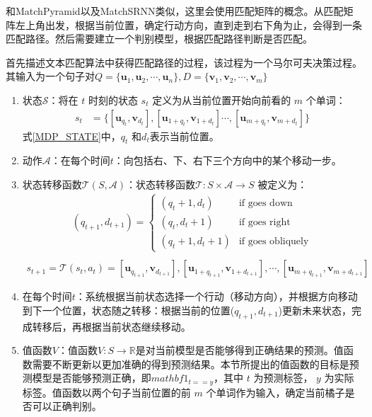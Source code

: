 和MatchPyramid以及MatchSRNN类似，这里会使用匹配矩阵的概念。从匹配矩阵左上角出发，根据当前位置，确定行动方向，直到走到右下角为止，会得到一条匹配路径。然后需要建立一个判别模型，根据匹配路径判断是否匹配。

首先描述文本匹配算法中获得匹配路径的过程，该过程为一个马尔可夫决策过程。其输入为一个句子对$Q=\{\mathbf{u}_1, \mathbf{u}_2,\cdots,\mathbf{u}_n\}, D=\{\mathbf{v}_1, \mathbf{v}_2,\cdots,\mathbf{v}_m\}$

\begin{enumerate}
	\item 状态$\mathcal{S}$：将在 $t$ 时刻的状态 $s_t$ 定义为从当前位置开始向前看的 $m$ 个单词：
	\begin{equation}\label{MDP_STATE}
	\begin{aligned}
		s_t &= \{[\mathbf{u}_{q_t}, \mathbf{v}_{d_t}], [\mathbf{u}_{1+q_t},\mathbf{v}_{1+d_t}] \cdots, [\mathbf{u}_{m+q_t}, \mathbf{v}_{m+d_t}]\}
	\end{aligned}
	\end{equation}
	式\eqref{MDP_STATE}中，$q_t$ 和$d_t$表示当前位置。
	\item 动作$\mathcal{A}$：在每个时间$t$：向包括右、下、右下三个方向中的某个移动一步。
	\item 状态转移函数$\mathcal{T}(S,\mathcal{A})$：状态转移函数$\mathcal{T}:S\times \mathcal{A}\rightarrow S$ 被定义为：
	\begin{equation}\label{MDP_STATE}
	\begin{aligned}
		(q_{t+1}, d_{t+1}) =
\begin{cases}
(q_{t} + 1, d_{t}) &\text{if goes down} \\
(q_{t}, d_{t} + 1) &\text{if goes right}  \\
(q_{t} + 1, d_{t} + 1) &\text{if goes obliquely}
\end{cases} \\
	\end{aligned}
	\end{equation}
	\begin{equation}\label{MDP_STATE2}
	\begin{aligned}
		s_{t+1} = \mathcal{T}(s_t,a_t)=[\mathbf{u}_{q_{t+1}},\mathbf{v}_{d_{t+1}}],[\mathbf{u}_{1+q_{t+1}},\mathbf{v}_{1+d_{t+1}}],\cdots,[\mathbf{u}_{m+q_{t+1}},\mathbf{v}_{m+d_{t+1}}]
	\end{aligned}
	\end{equation}
	\item 在每个时间$t$：系统根据当前状态选择一个行动（移动方向），并根据方向移动到下一个位置，状态随之转移：根据当前的位置($q_{t+1},d_{t+1}$)更新未来状态，完成转移后，再根据当前状态继续移动。
	\item 值函数$V$：值函数$V: S\rightarrow \mathbb{R}$是对当前模型是否能够得到正确结果的预测。值函数需要不断更新以更加准确的得到预测结果。本节所提出的值函数的目标是预测模型是否能够预测正确，即$mathbf{1}_{t==y}$，其中 $t$ 为预测标签， $y$ 为实际标签。值函数以两个句子当前位置的前 $m$ 个单词作为输入，确定当前橘子是否可以正确判别。


\end{enumerate}
